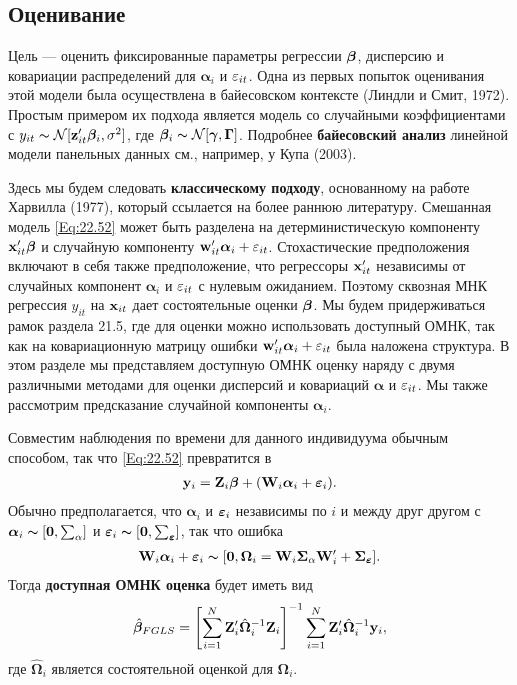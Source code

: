  \subsection{Оценивание}

Цель --- оценить фиксированные параметры регрессии $\bm{\beta}$, дисперсию и ковариации распределений для $\bm\alpha_i$ и $\varepsilon_{it}$. Одна из первых попыток оценивания этой модели была осуществлена в байесовском контексте  (Линдли и Смит, 1972). Простым примером их подхода является модель со случайными коэффициентами с $y_{it} \thicksim \mathcal N [\mathbf z'_{it}\bm{\beta}_i, \sigma^2]$, где $\bm{\beta}_i \thicksim \mathcal N [\bm\gamma, \bm\Gamma]$. Подробнее \textbf{байесовский анализ} линейной модели панельных данных см., например,  у Купа (2003).

Здесь мы будем следовать \textbf{классическому подходу}, основанному на работе Харвилла (1977), который ссылается на более раннюю литературу. Смешанная модель \ref{Eq:22.52}  может быть разделена на детерминистическую компоненту $\mathbf{x}'_{it} \bm{\beta}$ и случайную компоненту $\mathbf w'_{it} \bm\alpha_i+\varepsilon_{it}$. Стохастические предположения включают в себя также предположение, что регрессоры $\mathbf{x}'_{it}$ независимы от случайных компонент $\bm\alpha_i$ и $\varepsilon_{it}$  с нулевым ожиданием. Поэтому сквозная МНК регрессия $y_{it}$ на $\mathbf{x}_{it}$  дает состоятельные оценки $\bm{\beta}$. Мы будем придерживаться рамок раздела 21.5, где для оценки можно  использовать доступный ОМНК, так как на ковариационную матрицу ошибки $\mathbf w'_{it} \bm\alpha_i+\varepsilon_{it}$ была наложена структура. В этом разделе мы представляем доступную ОМНК оценку наряду с двумя различными методами для оценки дисперсий и ковариаций $\bm\alpha$ и $\varepsilon_{it}$. Мы также рассмотрим предсказание случайной компоненты $\bm\alpha_i$.

Совместим наблюдения по времени для данного индивидуума обычным способом, так что \ref{Eq:22.52} превратится в
\begin{align}
\mathbf y_i=\mathbf Z_i \bm{\beta}+(\mathbf W_i \bm\alpha_i+\bm{\varepsilon}_i).
\label{Eq:22.53}
\end{align}
Обычно предполагается, что $\bm\alpha_i$ и $\bm{\varepsilon}_i$  независимы по $i$  и между друг другом с $\bm\alpha_i \thicksim [\mathbf 0, \sum_{\alpha}]$ и $\bm{\varepsilon}_i \thicksim [ \mathbf 0, \sum_{\bm{\varepsilon}}]$, так что ошибка 
 \begin{align}
\mathbf W_i \bm\alpha_i+\bm{\varepsilon}_i \thicksim [\mathbf 0, \bm\Omega_i = \mathbf W_i \bm\Sigma_{\alpha} \mathbf W'_i + \bm\Sigma_{\bm{\varepsilon}}].
\nonumber
\end{align}
Тогда \textbf{доступная ОМНК оценка} будет иметь вид
\begin{align}
 \hat{\bm{\beta}}_{FGLS}=\left[ \sum^N_{i=1} \mathbf Z'_i \hat{\bm\Omega}^{-1}_i \mathbf Z_i 
\right] ^{-1}
\sum^N_{i=1} \mathbf Z'_i \hat{\bm\Omega}^{-1}_i \mathbf y_i,
\label{Eq:22.54}
\end{align}
где $\hat{\bm\Omega}_i$ является состоятельной оценкой для $\bm\Omega_i$.

